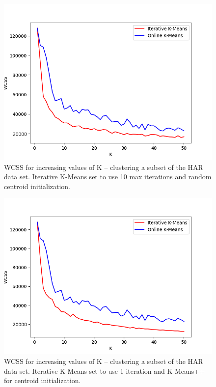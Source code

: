 \documentclass{l4proj}
\begin{document}
\begin{appendices}
\begin{figure}[H]
	\centering
    \label{fig:res3}
    \includegraphics[width=1.0\textwidth]{images/result3}
    \caption{WCSS for increasing values of K -- clustering a subset of the HAR data set. Iterative K-Means set to use 10 max iterations and random centroid initialization. } 
\end{figure}

\begin{figure}[H]
	\centering
    \label{fig:res4}
    \includegraphics[width=1.0\textwidth]{images/result4}
    \caption{WCSS for increasing values of K -- clustering a subset of the HAR data set. Iterative K-Means set to use 1 iteration and K-Means++ for centroid initialization. } 
\end{figure}


\end{appendices}
\end{document}
